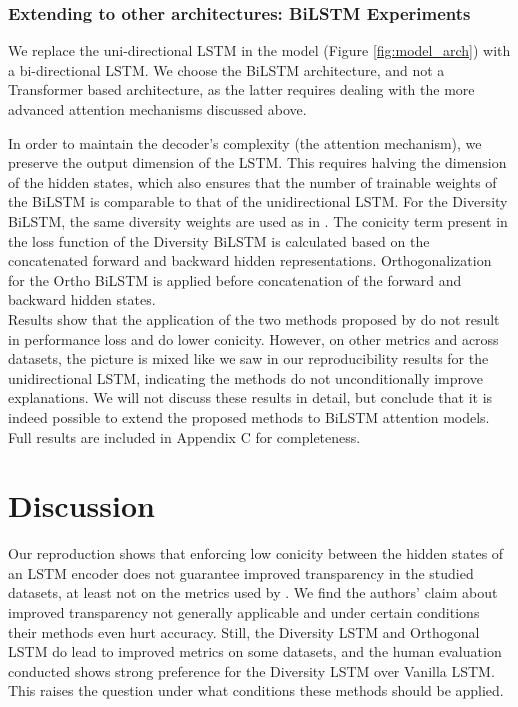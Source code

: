 \subsubsection{Extending to other architectures: BiLSTM Experiments}
We replace the uni-directional LSTM in the model (Figure \ref{fig:model_arch}) with a bi-directional LSTM. 
We choose the BiLSTM architecture, and not a Transformer based architecture, as the latter requires dealing with the more advanced attention mechanisms discussed above.
 
In order to maintain the decoder's complexity (the attention mechanism), we preserve the output dimension of the LSTM. This requires halving the dimension of the hidden states, which also ensures that the number of trainable weights of the BiLSTM is comparable to that of the unidirectional LSTM.
For the Diversity BiLSTM, the same diversity weights are used as in \citet{mohankumar_towards_2020}. 
The conicity term present in the loss function of the Diversity BiLSTM is calculated based on the concatenated forward and backward hidden representations. Orthogonalization for the Ortho BiLSTM is applied before concatenation of the forward and backward hidden states.\\
Results show that the application of the two methods proposed by \citet{mohankumar_towards_2020} do not result in performance loss and do lower conicity. 
However, on other metrics and across datasets, the picture is mixed like we saw in our reproducibility results for the unidirectional LSTM, indicating the methods do not unconditionally improve explanations. We will not discuss these results in detail, but conclude that it is indeed possible to extend the proposed methods to BiLSTM attention models. Full results are included in Appendix C for completeness.

\section{Discussion}
Our reproduction shows that enforcing low conicity between the hidden states of an LSTM encoder does not guarantee improved transparency in the studied datasets, at least not on the metrics used by \citet{mohankumar_towards_2020}. We find the authors' claim about improved transparency not generally applicable and under certain conditions their methods even hurt accuracy.
Still, the Diversity LSTM and Orthogonal LSTM do lead to improved metrics on some datasets, and the human evaluation \citet{mohankumar_towards_2020} conducted shows strong preference for the Diversity LSTM over Vanilla LSTM. This raises the question under what conditions these methods should be applied. 

